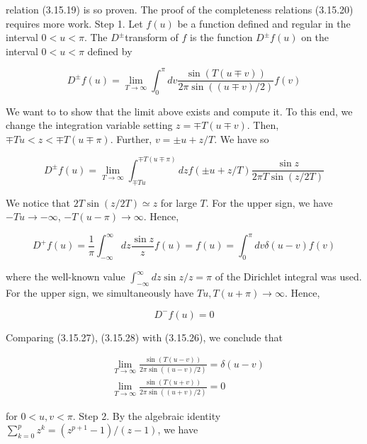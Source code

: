 \documentclass{article}
\begin{document}
relation (3.15.19) is so proven.
The proof of the completeness relations (3.15.20) requires more work.
Step 1. Let $f(u)$ be a function defined and regular in the interval $0<u<\pi$. The $D^{ \pm}$transform of $f$ is the function $D^{ \pm} f(u)$ on the interval $0<u<\pi$ defined by
 
\begin{equation*}
D^{ \pm} f(u)=\lim _{T \rightarrow \infty} \int_{0}^{\pi} d v \frac{\sin (T(u \mp v))}{2 \pi \sin ((u \mp v) / 2)} f(v) \tag{3.15.25}
\end{equation*}
 

We want to to show that the limit above exists and compute it. To this end, we change the integration variable setting $z=\mp T(u \mp v)$. Then, $\mp T u<z<\mp T(u \mp \pi)$. Further, $v= \pm u+z / T$. We have so
 
\begin{equation*}
D^{ \pm} f(u)=\lim _{T \rightarrow \infty} \int_{\mp T u}^{\mp T(u \mp \pi)} d z f( \pm u+z / T) \frac{\sin z}{2 \pi T \sin (z / 2 T)} \tag{3.15.26}
\end{equation*}
 

We notice that $2 T \sin (z / 2 T) \simeq z$ for large $T$. For the upper sign, we have $-T u \rightarrow-\infty$, $-T(u-\pi) \rightarrow \infty$. Hence,
 
\begin{equation*}
D^{+} f(u)=\frac{1}{\pi} \int_{-\infty}^{\infty} d z \frac{\sin z}{z} f(u)=f(u)=\int_{0}^{\pi} d v \delta(u-v) f(v) \tag{3.15.27}
\end{equation*}
 
where the well-known value $\int_{-\infty}^{\infty} d z \sin z / z=\pi$ of the Dirichlet integral was used. For the upper sign, we simultaneously have $T u, T(u+\pi) \rightarrow \infty$. Hence,
 
\begin{equation*}
D^{-} f(u)=0 \tag{3.15.28}
\end{equation*}
 

Comparing (3.15.27), (3.15.28) with (3.15.26), we conclude that
 
\begin{align*}
& \lim _{T \rightarrow \infty} \frac{\sin (T(u-v))}{2 \pi \sin ((u-v) / 2)}=\delta(u-v)  \tag{3.15.29}\\
& \lim _{T \rightarrow \infty} \frac{\sin (T(u+v))}{2 \pi \sin ((u+v) / 2)}=0 \tag{3.15.30}
\end{align*}
 
for $0<u, v<\pi$.
Step 2. By the algebraic identity $\sum_{k=0}^{p} z^{k}=\left(z^{p+1}-1\right) /(z-1)$, we have
 
\end{document}
